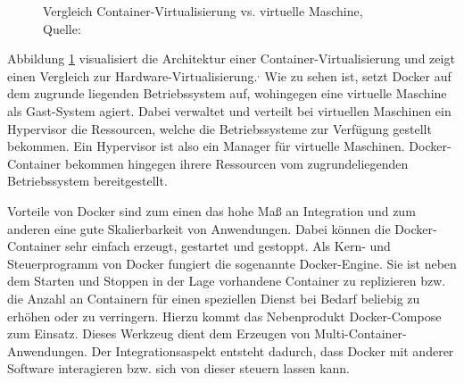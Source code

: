 \begin{figure}[h]
	\centering
	\captionsetup{justification=centering, format=plain}
	\hspace{1cm}
	\caption[Vergleich Container-Virtualisierung vs. virtuelle Maschine]{\label{fig:docker_container}Vergleich Container-Virtualisierung vs. virtuelle Maschine, \\Quelle: \cite{MS-DockerInc..05.03.2019}}
\end{figure}

Abbildung \ref{fig:docker_container} visualisiert die Architektur einer Container-Virtualisierung und zeigt einen Vergleich zur Hardware-Virtualisierung.\autocite[Vgl.][]{MS-ChrissiKraus.27.07.2018}$^,$\autocite[Vgl.][]{MS-MicrosoftCorporation.31.08.2018} 
Wie zu sehen ist, setzt Docker auf dem zugrunde liegenden Betriebssystem auf, wohingegen eine virtuelle Maschine als Gast-System agiert. 
Dabei verwaltet und verteilt bei virtuellen Maschinen ein Hypervisor die Ressourcen, welche die Betriebssysteme zur Verfügung gestellt bekommen. 
Ein Hypervisor ist also ein Manager für virtuelle Maschinen\autocite[Vgl.][]{MS-ReneBust.06.04.2010}. 
Docker-Container bekommen hingegen ihrere Ressourcen vom zugrundeliegenden Betriebssystem bereitgestellt.

Vorteile von Docker sind zum einen das hohe Maß an Integration und zum anderen eine gute Skalierbarkeit von Anwendungen. 
Dabei können die Docker-Container sehr einfach erzeugt, gestartet und gestoppt. 
Als Kern- und Steuerprogramm von Docker fungiert die sogenannte Docker-Engine. Sie ist neben dem Starten und Stoppen in der Lage vorhandene Container zu replizieren bzw. die Anzahl an Containern für einen speziellen Dienst bei Bedarf beliebig zu erhöhen oder zu verringern.
Hierzu kommt das Nebenprodukt Docker-Compose zum Einsatz. 
Dieses Werkzeug dient dem Erzeugen von Multi-Container-Anwendungen.
Der Integrationsaspekt entsteht dadurch, dass Docker mit anderer Software interagieren bzw. sich von dieser steuern lassen kann.\autocite[Vgl.][]{MS-Docker-Compose} 